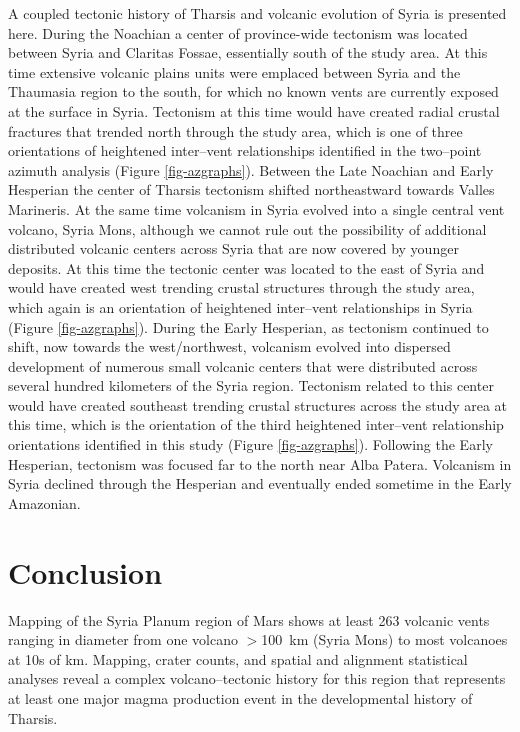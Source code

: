 \documentclass[preprint,review,authoryear,12pt]{elsarticle}
\begin{document}
A coupled tectonic history of Tharsis and volcanic evolution of Syria is presented here.  During the Noachian a center of province-wide tectonism was located between Syria and Claritas Fossae, essentially south of the study area. At this time extensive volcanic plains units were emplaced between Syria and the Thaumasia region to the south, for which no known vents are currently exposed at the surface in Syria. Tectonism at this time would have created radial crustal fractures that trended north through the study area, which is one of three orientations of heightened inter--vent relationships identified in the two--point azimuth analysis (Figure \ref{fig-azgraphs}). Between the Late Noachian and Early Hesperian the center of Tharsis tectonism shifted northeastward towards Valles Marineris.  At the same time volcanism in Syria evolved into a single central vent volcano, Syria Mons, although we cannot rule out the possibility of additional distributed volcanic centers across Syria that are now covered by younger deposits. At this time the tectonic center was located to the east of Syria and would have created west trending crustal structures through the study area, which again is an orientation of heightened inter--vent relationships in Syria (Figure \ref{fig-azgraphs}). During the Early Hesperian, as tectonism continued to shift, now towards the west/northwest, volcanism evolved into dispersed development of numerous small volcanic centers that were distributed across several hundred kilometers of the Syria region.  Tectonism related to this center would have created southeast trending crustal structures across the study area at this time, which is the orientation of the third heightened inter--vent relationship orientations identified in this study (Figure \ref{fig-azgraphs}).  Following the Early Hesperian, tectonism was focused far to the north near Alba Patera. Volcanism in Syria declined through the Hesperian and eventually ended sometime in the Early Amazonian.

\section{Conclusion}
Mapping of the Syria Planum region of Mars shows at least 263 volcanic vents ranging in diameter from one volcano $>$100~km (Syria Mons) to most volcanoes at 10s of km. Mapping, crater counts, and spatial and alignment statistical analyses reveal a complex volcano--tectonic history for this region that represents at least one major magma production event in the developmental history of Tharsis. 
\end{document}
